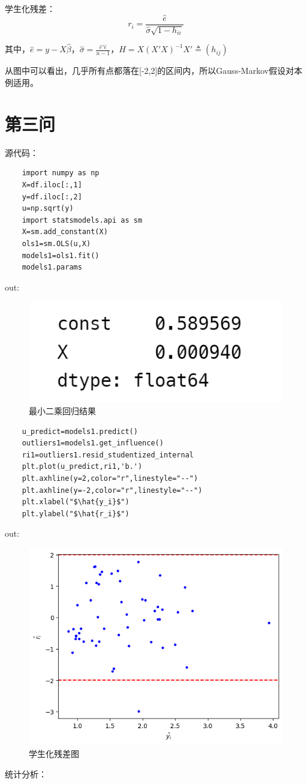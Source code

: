 \documentclass[a4paper,12pt]{article}
\begin{document}
学生化残差：$$r_i=\frac{\hat{e}}{\hat{\sigma}\sqrt{1-h_{ii}}}$$

其中，$\hat{e}=y-X\hat{\beta}$，$\hat{\sigma}=\frac{\hat{e}'\hat{e}}{n-1}$，$H=X(X'X)^{-1}X'\triangleq (h_{ij})$

从图中可以看出，几乎所有点都落在[-2,2]的区间内，所以Gauss-Markov假设对本例适用。

\section{第三问}

源代码：
\begin{lstlisting}
	import numpy as np
	X=df.iloc[:,1]
	y=df.iloc[:,2]
	u=np.sqrt(y)
	import statsmodels.api as sm
	X=sm.add_constant(X)
	ols1=sm.OLS(u,X)
	models1=ols1.fit()
	models1.params
\end{lstlisting}
out: 
\begin{figure}[htbp]
	\centering
	\includegraphics[scale=0.4]{out3.png}
	\caption{最小二乘回归结果}
\end{figure}
\begin{lstlisting}
	u_predict=models1.predict()
	outliers1=models1.get_influence()
	ri1=outliers1.resid_studentized_internal
	plt.plot(u_predict,ri1,'b.')
	plt.axhline(y=2,color="r",linestyle="--")
	plt.axhline(y=-2,color="r",linestyle="--")
	plt.xlabel("$\hat{y_i}$")
	plt.ylabel("$\hat{r_i}$")
\end{lstlisting}
out: 
\begin{figure}[htbp]
	\centering
	\includegraphics[scale=0.4]{out4.png}
	\caption{学生化残差图}
\end{figure}
统计分析：
\end{document}
